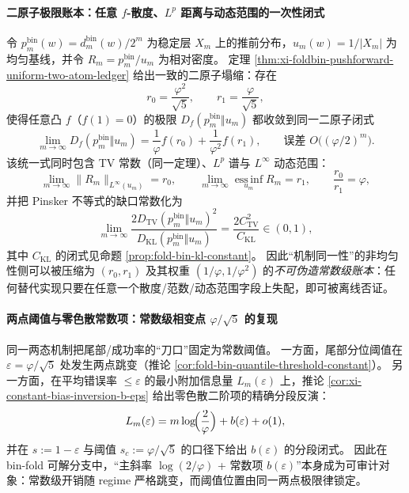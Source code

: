 \paragraph{二原子极限账本：任意 \texorpdfstring{$f$}{f}-散度、\texorpdfstring{$L^p$}{Lp} 距离与动态范围的一次性闭式}
令 \(p_m^{\mathrm{bin}}(w)=d_m^{\mathrm{bin}}(w)/2^m\) 为稳定层 \(X_m\) 上的推前分布，\(u_m(w)=1/|X_m|\) 为均匀基线，并令 \(R_m=p_m^{\mathrm{bin}}/u_m\) 为相对密度。
定理 \ref{thm:xi-foldbin-pushforward-uniform-two-atom-ledger} 给出一致的二原子塌缩：存在
\[
r_0=\frac{\varphi^2}{\sqrt5},\qquad r_1=\frac{\varphi}{\sqrt5},
\]
使得任意凸 \(f\)（\(f(1)=0\)）的极限 \(D_f(p_m^{\mathrm{bin}}\Vert u_m)\) 都收敛到同一二原子闭式
\[
\lim_{m\to\infty}D_f(p_m^{\mathrm{bin}}\Vert u_m)
=\frac{1}{\varphi}f(r_0)+\frac{1}{\varphi^2}f(r_1),
\qquad
\text{误差 }O\!\bigl((\varphi/2)^m\bigr).
\]
该统一式同时包含 TV 常数（同一定理）、\(L^p\) 谱与 \(L^\infty\) 动态范围：
\[
\lim_{m\to\infty}\|R_m\|_{L^\infty(u_m)}=r_0,\qquad
\lim_{m\to\infty}\operatorname*{ess\,inf}_{u_m}R_m=r_1,\qquad
\frac{r_0}{r_1}=\varphi,
\]
并把 Pinsker 不等式的缺口常数化为
\[
\lim_{m\to\infty}\frac{2D_{\mathrm{TV}}(p_m^{\mathrm{bin}}\Vert u_m)^2}{D_{\mathrm{KL}}(p_m^{\mathrm{bin}}\Vert u_m)}
=\frac{2C_{\mathrm{TV}}^2}{C_{\mathrm{KL}}}\in(0,1),
\]
其中 \(C_{\mathrm{KL}}\) 的闭式见命题 \ref{prop:fold-bin-kl-constant}。
因此“机制同一性”的非均匀性侧可以被压缩为 \((r_0,r_1)\) 及其权重 \((1/\varphi,1/\varphi^2)\) 的\emph{不可伪造常数级账本}：任何替代实现只要在任意一个散度/范数/动态范围字段上失配，即可被离线否证。

\paragraph{两点阈值与零色散常数项：常数级相变点 \texorpdfstring{$\varphi/\sqrt5$}{phi/sqrt5} 的复现}
同一两态机制把尾部/成功率的“刀口”固定为常数阈值。
一方面，尾部分位阈值在 \(\varepsilon=\varphi/\sqrt5\) 处发生两点跳变（推论 \ref{cor:fold-bin-quantile-threshold-constant}）。
另一方面，在平均错误率 \(\le\varepsilon\) 的最小附加信息量 \(L_m(\varepsilon)\) 上，推论 \ref{cor:xi-constant-bias-inversion-b-eps} 给出零色散二阶项的精确分段反演：
\[
L_m(\varepsilon)=m\log\!\Bigl(\frac{2}{\varphi}\Bigr)+b(\varepsilon)+o(1),
\]
并在 \(s:=1-\varepsilon\) 与阈值 \(s_c:=\varphi/\sqrt5\) 的口径下给出 \(b(\varepsilon)\) 的分段闭式。
因此在 bin-fold 可解分支中，“主斜率 \(\log(2/\varphi)\) + 常数项 \(b(\varepsilon)\)”本身成为可审计对象：常数级开销随 regime 严格跳变，而阈值位置由同一两点极限律锁定。


